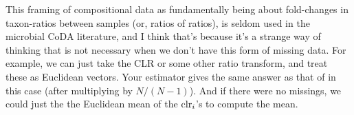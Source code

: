 This framing of compositional data as fundamentally being about fold-changes in
taxon-ratios between samples (or, ratios of ratios), is seldom used in the
microbial CoDA literature, and I think that's because it's a strange way of
thinking that is not necessary when we don't have this form of missing data.
For example, we can just take the CLR or some other ratio transform, and treat
these as Euclidean vectors. Your estimator gives the same answer as that of
\textcite{vandenBoogaart2006} in this case (after multiplying by $N / (N-1)$).
And if there were no missings, we could just the the Euclidean mean of the
$\operatorname{clr}_i$'s to compute the mean.

\printbibliography



